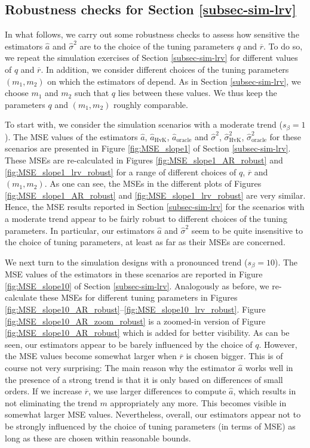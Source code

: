 \subsection*{Robustness checks for Section \ref{subsec-sim-lrv}}


In what follows, we carry out some robustness checks to assess how sensitive the estimators $\widehat{a}$ and $\widehat{\sigma}^2$ are to the choice of the tuning parameters $q$ and $\overline{r}$. To do so, we repeat the simulation exercises of Section \ref{subsec-sim-lrv} for different values of $q$ and $\overline{r}$. In addition, we consider different choices of the tuning parameters $(m_1,m_2)$ on which the estimators of \cite{Hall2003} depend. As in Section \ref{subsec-sim-lrv}, we choose $m_1$ and $m_2$ such that $q$ lies between these values. We thus keep the parameters $q$ and $(m_1,m_2)$ roughly comparable. 


To start with, we consider the simulation scenarios with a moderate trend ($s_\beta = 1$). The MSE values of the estimators $\widehat{a}$, $\widehat{a}_{\text{HvK}}$, $\widehat{a}_{\text{oracle}}$ and $\widehat{\sigma}^2$, $\widehat{\sigma}^2_{\text{HvK}}$, $\widehat{\sigma}^2_{\text{oracle}}$ for these scenarios are presented in Figure \ref{fig:MSE_slope1} of Section \ref{subsec-sim-lrv}. These MSEs are re-calculated in Figures \ref{fig:MSE_slope1_AR_robust} and \ref{fig:MSE_slope1_lrv_robust} for a range of different choices of $q$, $\overline{r}$ and $(m_1,m_2)$. As one can see, the MSEs in the different plots of Figures \ref{fig:MSE_slope1_AR_robust} and \ref{fig:MSE_slope1_lrv_robust} are very similar. Hence, the MSE results reported in Section \ref{subsec-sim-lrv} for the scenarios with a moderate trend appear to be fairly robust to different choices of the tuning parameters. In particular, our estimators $\widehat{a}$ and $\widehat{\sigma}^2$ seem to be quite insensitive to the choice of tuning parameters, at least as far as their MSEs are concerned.


We next turn to the simulation designs with a pronounced trend ($s_\beta = 10$). The MSE values of the estimators in these scenarios are reported in Figure \ref{fig:MSE_slope10} of Section \ref{subsec-sim-lrv}. Analogously as before, we re-calculate these MSEs for different tuning parameters in Figures \ref{fig:MSE_slope10_AR_robust}--\ref{fig:MSE_slope10_lrv_robust}. Figure \ref{fig:MSE_slope10_AR_zoom_robust} is a zoomed-in version of Figure \ref{fig:MSE_slope10_AR_robust} which is added for better visibility. As can be seen, our estimators appear to be barely influenced by the choice of $q$. However, the MSE values become somewhat larger when $\overline{r}$ is chosen bigger. This is of course not very surprising: The main reason why the estimator $\widehat{a}$ works well in the presence of a strong trend is that it is only based on differences of small orders. If we increase $\overline{r}$, we use larger differences to compute $\widehat{a}$, which results in not eliminating the trend $m$ appropriately any more. This becomes visible in somewhat larger MSE values. Nevertheless, overall, our estimators appear not to be strongly influenced by the choice of tuning parameters (in terms of MSE) as long as these are chosen within reasonable bounds. 


